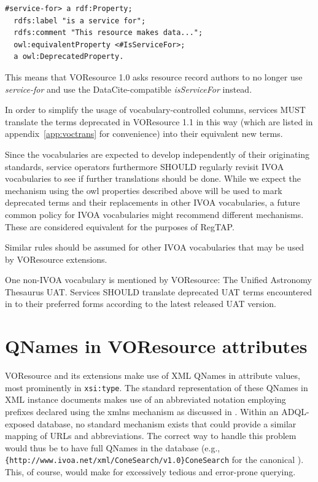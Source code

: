 \documentclass[11pt,a4paper]{ivoa}
\begin{document}
\begin{verbatim}
#service-for> a rdf:Property;
  rdfs:label "is a service for";
  rdfs:comment "This resource makes data...";
  owl:equivalentProperty <#IsServiceFor>;
  a owl:DeprecatedProperty.
\end{verbatim}

This means that VOResource 1.0 asks resource record authors to no longer
use \emph{service-for} and use the DataCite-compatible
\emph{isServiceFor} instead.

In order to simplify the usage of vocabulary-controlled columns,
services MUST translate the terms deprecated in VOResource 1.1 in this
way (which are listed in appendix~\ref{app:voctrans} for convenience)
into their equivalent new terms.

Since the vocabularies are expected to develop independently of their
originating standards, service operators furthermore SHOULD regularly
revisit IVOA vocabularies to see if further translations should be done.
While we expect the mechanism using the owl properties described above
will be used to mark deprecated terms and their replacements in other
IVOA vocabularies, a future common policy for IVOA vocabularies might
recommend different mechanisms. These are considered equivalent for the
purposes of RegTAP.

Similar rules should be assumed for other IVOA vocabularies that may be
used by VOResource extensions.

One non-IVOA vocabulary is mentioned by VOResource: The Unified
Astronomy Thesaurus UAT.  
Services SHOULD translate deprecated UAT terms encountered in
 to their preferred forms according to the latest
released UAT version.


\section{QNames in VOResource attributes}

\label{qnameatts}

VOResource and its extensions make use of XML QNames in attribute
values, most prominently in \texttt{xsi:type}.  The standard
representation of these QNames in XML instance documents makes use of an
abbreviated notation employing prefixes declared using the xmlns mechanism
as discussed in \citet{std:XMLNS}.  Within an ADQL-exposed database, no
standard mechanism exists that could provide a similar mapping of URLs
and abbreviations.  The correct way to handle this problem would thus be
to have full QNames in the database (e.g.,
\verb|{http://www.ivoa.net/xml/ConeSearch/v1.0}ConeSearch| for the
canonical ).  This, of course, would make for
excessively tedious and error-prone querying.
\end{document}
